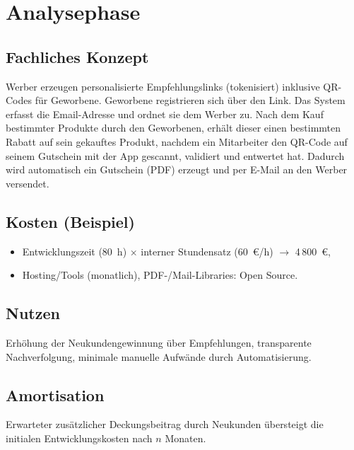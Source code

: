 \section{Analysephase}
\label{sec:Analysephase}

\subsection{Fachliches Konzept}
Werber erzeugen personalisierte Empfehlungslinks (tokenisiert) inklusive QR-Codes für Geworbene. Geworbene registrieren sich über den Link. Das System erfasst die Email-Adresse und ordnet sie dem Werber zu. Nach dem Kauf bestimmter Produkte durch den Geworbenen, erhält dieser einen bestimmten Rabatt auf sein gekauftes Produkt, nachdem ein Mitarbeiter den QR-Code auf seinem Gutschein mit der App gescannt, validiert und entwertet hat. Dadurch wird automatisch ein Gutschein (PDF) erzeugt und per E-Mail an den Werber versendet.

\subsection{Kosten (Beispiel)}
\begin{itemize}
  \item Entwicklungszeit (80~h) \(\times\) interner Stundensatz (60~€/h) \(\rightarrow\) 4\,800~€,
  \item Hosting/Tools (monatlich), PDF-/Mail-Libraries: Open Source.
\end{itemize}

\subsection{Nutzen}
Erhöhung der Neukundengewinnung über Empfehlungen, transparente Nachverfolgung, minimale manuelle Aufwände durch Automatisierung.

\subsection{Amortisation}
Erwarteter zusätzlicher Deckungsbeitrag durch Neukunden übersteigt die initialen Entwicklungskosten nach \(n\) Monaten.
